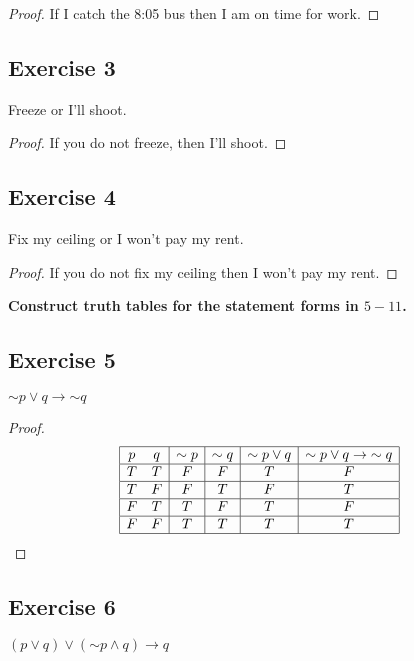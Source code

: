 \documentclass[14pt]{extarticle}
\begin{document}
\begin{proof}
    If I catch the 8:05 bus then I am on time for work.
\end{proof}

\subsection{Exercise 3} Freeze or I’ll shoot.

\begin{proof}
    If you do not freeze, then I’ll shoot.
\end{proof}

\subsection{Exercise 4}
Fix my ceiling or I won’t pay my rent.

\begin{proof}
    If you do not fix my ceiling then I won't pay my rent.
\end{proof}

{\bf Construct truth tables for the statement forms in $5-11$.}

\subsection{Exercise 5}
${\sim p} \vee q \to {\sim q}$

\begin{proof}
    $$
        \begin{array}{|cc|c|c|c|c|}
            \hline
            p & q & {\sim p} & {\sim q} & {\sim p} \vee q & {\sim p} \vee q \to {\sim q} \\
            \hline
            T & T & F        & F        & T               & F                            \\
            \hline
            T & F & F        & T        & F               & T                            \\
            \hline
            F & T & T        & F        & T               & F                            \\
            \hline
            F & F & T        & T        & T               & T                            \\
            \hline
        \end{array}
    $$
\end{proof}

\subsection{Exercise 6}
$(p \vee q) \vee ({\sim p} \wedge q) \to q$
\end{document}
